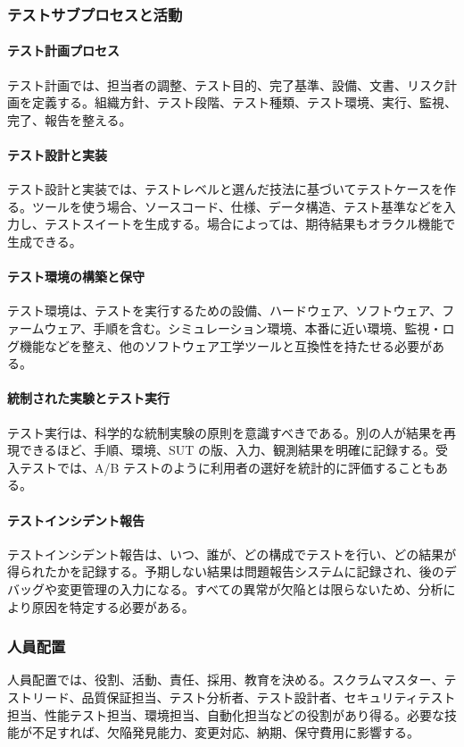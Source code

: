 \subsubsection{テストサブプロセスと活動}
\paragraph{テスト計画プロセス}
テスト計画では、担当者の調整、テスト目的、完了基準、設備、文書、リスク計画を定義する。組織方針、テスト段階、テスト種類、テスト環境、実行、監視、完了、報告を整える。

\paragraph{テスト設計と実装}
テスト設計と実装では、テストレベルと選んだ技法に基づいてテストケースを作る。ツールを使う場合、ソースコード、仕様、データ構造、テスト基準などを入力し、テストスイートを生成する。場合によっては、期待結果もオラクル機能で生成できる。

\paragraph{テスト環境の構築と保守}
テスト環境は、テストを実行するための設備、ハードウェア、ソフトウェア、ファームウェア、手順を含む。シミュレーション環境、本番に近い環境、監視・ログ機能などを整え、他のソフトウェア工学ツールと互換性を持たせる必要がある。

\paragraph{統制された実験とテスト実行}
テスト実行は、科学的な統制実験の原則を意識すべきである。別の人が結果を再現できるほど、手順、環境、SUT の版、入力、観測結果を明確に記録する。受入テストでは、A/B テストのように利用者の選好を統計的に評価することもある。

\paragraph{テストインシデント報告}
テストインシデント報告は、いつ、誰が、どの構成でテストを行い、どの結果が得られたかを記録する。予期しない結果は問題報告システムに記録され、後のデバッグや変更管理の入力になる。すべての異常が欠陥とは限らないため、分析により原因を特定する必要がある。

\subsubsection{人員配置}
人員配置では、役割、活動、責任、採用、教育を決める。スクラムマスター、テストリード、品質保証担当、テスト分析者、テスト設計者、セキュリティテスト担当、性能テスト担当、環境担当、自動化担当などの役割があり得る。必要な技能が不足すれば、欠陥発見能力、変更対応、納期、保守費用に影響する。
